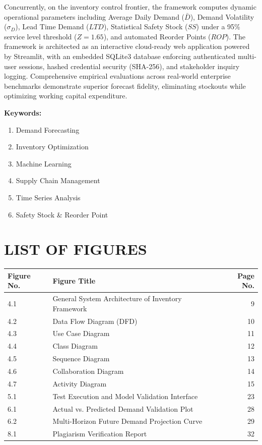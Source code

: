 \documentclass[12pt,a4paper]{report}
\begin{document}
Concurrently, on the inventory control frontier, the framework computes dynamic operational parameters including Average Daily Demand ($\bar{D}$), Demand Volatility ($\sigma_D$), Lead Time Demand ($LTD$), Statistical Safety Stock ($SS$) under a 95\% service level threshold ($Z = 1.65$), and automated Reorder Points ($ROP$). The framework is architected as an interactive cloud-ready web application powered by Streamlit, with an embedded SQLite3 database enforcing authenticated multi-user sessions, hashed credential security (SHA-256), and stakeholder inquiry logging. Comprehensive empirical evaluations across real-world enterprise benchmarks demonstrate superior forecast fidelity, eliminating stockouts while optimizing working capital expenditure.

\vspace{1em}
\noindent \textbf{Keywords:}
\begin{enumerate}
    \item Demand Forecasting
    \item Inventory Optimization
    \item Machine Learning
    \item Supply Chain Management
    \item Time Series Analysis
    \item Safety Stock \& Reorder Point
\end{enumerate}

\newpage
\chapter*{LIST OF FIGURES}
\begin{tabular}{llr}
\textbf{Figure No.} & \textbf{Figure Title} & \textbf{Page No.} \\
\midrule
4.1 & General System Architecture of Inventory Framework & 9 \\
4.2 & Data Flow Diagram (DFD) & 10 \\
4.3 & Use Case Diagram & 11 \\
4.4 & Class Diagram & 12 \\
4.5 & Sequence Diagram & 13 \\
4.6 & Collaboration Diagram & 14 \\
4.7 & Activity Diagram & 15 \\
5.1 & Test Execution and Model Validation Interface & 23 \\
6.1 & Actual vs. Predicted Demand Validation Plot & 28 \\
6.2 & Multi-Horizon Future Demand Projection Curve & 29 \\
8.1 & Plagiarism Verification Report & 32 \\
\bottomrule
\end{tabular}
\end{document}
